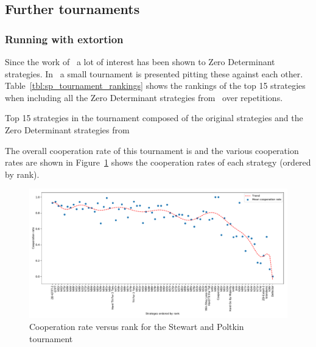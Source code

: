 \documentclass{article}
\begin{document}
\subsection{Further tournaments}


\subsubsection{Running with extortion}\label{sec:run_with_stewart_plotkin}

Since the work of~\cite{Press2012} a lot of interest has been shown to Zero
Determinant strategies. In~\cite{Stewart2012} a small tournament is presented
pitting these against each other. Table~\ref{tbl:sp_tournament_rankings}
shows the rankings of the top 15 strategies when including all the Zero
Determinant strategies from~\cite{Stewart2012} over
repetitions.

\begin{table}[!hbtp]
        \centering
        
        \caption{Top 15 strategies in the tournament composed of the original
                 strategies and the Zero Determinant strategies
                 from~\cite{Stewart2012}}
        \label{tbl:sp_tournament_rankings}
\end{table}

The overall cooperation rate of this tournament is
and the various
cooperation rates are shown in
Figure~\ref{fig:sp_tournament_cooperation_rate_versus_rank} shows the
cooperation rates of each strategy (ordered by rank).

\begin{figure}[!hbtp]
    \centering
    \includegraphics[width=.8\textwidth]{assets/sp_tournament_cooperation_rate_versus_rank.pdf}
    \caption{Cooperation rate versus rank for the Stewart and Poltkin tournament}
    \label{fig:sp_tournament_cooperation_rate_versus_rank}
\end{figure}
\end{document}

